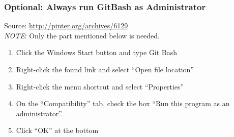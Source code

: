 \subsubsection{Optional: Always run GitBash as Administrator}
Source: \url{http://pinter.org/archives/6129} \\
\noindent \textit{NOTE}: Only the part mentioned below is needed.
\begin{enumerate}
    \item Click the Windows Start button and type Git Bash
    \item Right-click the found link and select ``Open file location''
    \item Right-click the menu shortcut and select ``Properties''
    \item On the ``Compatibility'' tab, check the box ``Run this program as an administrator''.
    \item Click ``OK'' at the bottom
\end{enumerate}
